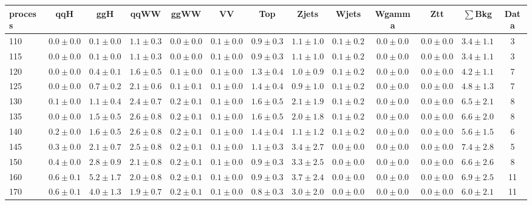\begin{table}
{%
 \tiny
 \begin{center}
 \begin{tabular}{l | c c | c c c c c c c c  | c c}
 \hline
 process & qqH & ggH & qqWW & ggWW & VV & Top & Zjets & Wjets & Wgamma & Ztt & $\sum$Bkg & Data \\
 \hline
110 & $0.0\pm0.0$ & $0.1\pm0.0$ & $1.1\pm0.3$ & $0.0\pm0.0$ & $0.1\pm0.0$ & $0.9\pm0.3$ & $1.1\pm1.0$ & $0.1\pm0.2$ & $0.0\pm0.0$ & $0.0\pm0.0$ & $3.4\pm1.1$ & 3 \\
115 & $0.0\pm0.0$ & $0.1\pm0.0$ & $1.1\pm0.3$ & $0.0\pm0.0$ & $0.1\pm0.0$ & $0.9\pm0.3$ & $1.1\pm1.0$ & $0.1\pm0.2$ & $0.0\pm0.0$ & $0.0\pm0.0$ & $3.4\pm1.1$ & 3 \\
120 & $0.0\pm0.0$ & $0.4\pm0.1$ & $1.6\pm0.5$ & $0.1\pm0.0$ & $0.1\pm0.0$ & $1.3\pm0.4$ & $1.0\pm0.9$ & $0.1\pm0.2$ & $0.0\pm0.0$ & $0.0\pm0.0$ & $4.2\pm1.1$ & 7 \\
125 & $0.0\pm0.0$ & $0.7\pm0.2$ & $2.1\pm0.6$ & $0.1\pm0.1$ & $0.1\pm0.0$ & $1.4\pm0.4$ & $0.9\pm1.0$ & $0.1\pm0.2$ & $0.0\pm0.0$ & $0.0\pm0.0$ & $4.8\pm1.3$ & 7 \\
130 & $0.1\pm0.0$ & $1.1\pm0.4$ & $2.4\pm0.7$ & $0.2\pm0.1$ & $0.1\pm0.0$ & $1.6\pm0.5$ & $2.1\pm1.9$ & $0.1\pm0.2$ & $0.0\pm0.0$ & $0.0\pm0.0$ & $6.5\pm2.1$ & 8 \\
135 & $0.0\pm0.0$ & $1.5\pm0.5$ & $2.6\pm0.8$ & $0.2\pm0.1$ & $0.1\pm0.0$ & $1.6\pm0.5$ & $2.0\pm1.8$ & $0.1\pm0.2$ & $0.0\pm0.0$ & $0.0\pm0.0$ & $6.6\pm2.0$ & 8 \\
140 & $0.2\pm0.0$ & $1.6\pm0.5$ & $2.6\pm0.8$ & $0.2\pm0.1$ & $0.1\pm0.0$ & $1.4\pm0.4$ & $1.1\pm1.2$ & $0.1\pm0.2$ & $0.0\pm0.0$ & $0.0\pm0.0$ & $5.6\pm1.5$ & 6 \\
145 & $0.3\pm0.0$ & $2.1\pm0.7$ & $2.5\pm0.8$ & $0.2\pm0.1$ & $0.1\pm0.0$ & $1.1\pm0.3$ & $3.4\pm2.7$ & $0.0\pm0.0$ & $0.0\pm0.0$ & $0.0\pm0.0$ & $7.4\pm2.8$ & 5 \\
150 & $0.4\pm0.0$ & $2.8\pm0.9$ & $2.1\pm0.8$ & $0.2\pm0.1$ & $0.1\pm0.0$ & $0.9\pm0.3$ & $3.3\pm2.5$ & $0.0\pm0.0$ & $0.0\pm0.0$ & $0.0\pm0.0$ & $6.6\pm2.6$ & 8 \\
160 & $0.6\pm0.1$ & $5.2\pm1.7$ & $2.0\pm0.8$ & $0.2\pm0.1$ & $0.1\pm0.0$ & $0.9\pm0.3$ & $3.7\pm2.4$ & $0.0\pm0.0$ & $0.0\pm0.0$ & $0.0\pm0.0$ & $6.9\pm2.5$ & 11 \\
170 & $0.6\pm0.1$ & $4.0\pm1.3$ & $1.9\pm0.7$ & $0.2\pm0.1$ & $0.1\pm0.0$ & $0.8\pm0.3$ & $3.0\pm2.0$ & $0.0\pm0.0$ & $0.0\pm0.0$ & $0.0\pm0.0$ & $6.0\pm2.1$ & 11 \\

\end{tabular}
\end{center}}
\end{table}
